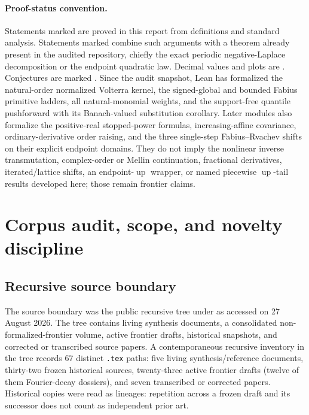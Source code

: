 \documentclass[11pt,oneside]{article}
\theoremstyle{definition}
\theoremstyle{remark}
\newcommand{\Up}{\operatorname{up}}
\newcommand{\1}{\mathbf 1}
\begin{document}
\paragraph{Proof-status convention.}
Statements marked \statusproved{} are proved in this report from definitions and standard
analysis.  Statements marked \statusderived{} combine such arguments with a theorem already
present in the audited repository, chiefly the exact periodic negative-Laplace decomposition
or the endpoint quadratic law.  Decimal values and plots are \statusnumeric{}.  Conjectures
are marked \statusopen{}.  Since the audit snapshot, Lean has formalized the natural-order
normalized Volterra kernel, the signed-global and bounded Fabius primitive ladders, all
natural-monomial weights, and the support-free quantile pushforward with its Banach-valued
substitution corollary.  Later modules also formalize the positive-real stopped-power
formulas, increasing-affine covariance, ordinary-derivative order raising, and the three
single-step Fabius--Rvachev shifts on their explicit endpoint domains.  They do not imply the nonlinear inverse transmutation,
complex-order or Mellin continuation, fractional derivatives, iterated/lattice shifts, an
endpoint-\(\Up\) wrapper, or named piecewise \(\Up\)-tail results developed here; those
remain frontier claims.


\clearpage

\section{Corpus audit, scope, and novelty discipline}
\label{p7:sec:audit}

\subsection{Recursive source boundary}

The source boundary was the public recursive tree under \repoPartxx{} as accessed on
27 August 2026.  The tree contains living synthesis documents, a consolidated
non-formalized-frontier volume, active frontier drafts, historical snapshots, and corrected or
transcribed source papers.  A contemporaneous recursive inventory in the tree records
$67$ distinct \texttt{.tex} paths: five living synthesis/reference documents, thirty-two
frozen historical sources, twenty-three active frontier drafts (twelve of them Fourier-decay
dossiers), and seven transcribed or corrected papers.  Historical copies were read as
lineages: repetition across a frozen draft and its successor does not count as independent
prior art.
\end{document}
